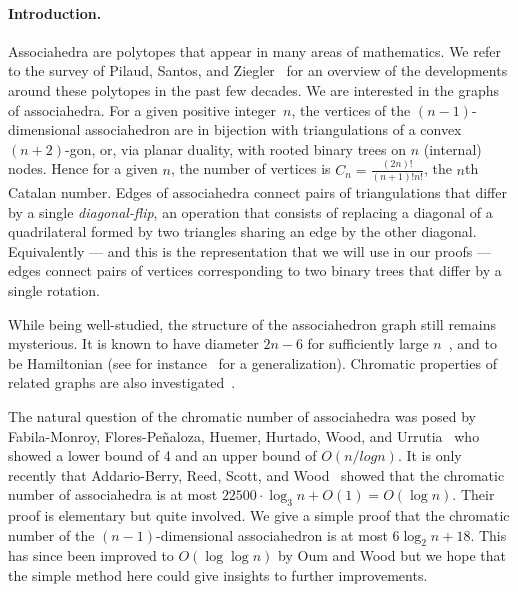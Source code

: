 \documentclass[10pt,a4paper]{article}
\begin{document}
\paragraph{Introduction.}
Associahedra are polytopes that appear in many areas of mathematics.
We refer to the survey of Pilaud, Santos, and Ziegler~\cite{MR4675114} for an overview of the developments around these polytopes in the past few decades.
We are interested in the graphs of associahedra.
For a given positive integer~$n$, the vertices of the $(n-1)$-dimensional associahedron are in bijection with triangulations of a convex $(n+2)$-gon, or, via planar duality, with rooted binary trees on $n$ (internal) nodes.
Hence for a given $n$, the number of vertices is $C_n = \frac{(2n)!}{(n+1)!n!}$, the $n$th Catalan number.
Edges of associahedra connect pairs of triangulations that differ by a single
\emph{diagonal-flip}, an operation that consists of 
replacing a diagonal of a quadrilateral
formed by two triangles sharing an edge by the other diagonal. Equivalently
--- and this is the representation that we will use in our proofs ---
edges connect pairs of vertices corresponding to two binary trees that differ by
a single rotation.%

While being well-studied, the structure of the associahedron graph still remains
mysterious. It is known to have diameter $2n-6$ for sufficiently large $n$~\cite{MR4556611,MR3197650}, and
to be Hamiltonian (see for instance~\cite{MR3383157} for a generalization).
Chromatic properties of related graphs are also investigated~\cite{MR4778792,GargantiniPastineEtAl2026,MPZZ25}.

The natural question of the chromatic number of associahedra was posed by Fabila-Monroy, Flores-Pe\~naloza, Huemer, Hurtado, Wood, and Urrutia~\cite{DBLP:journals/dmtcs/MonroyFHHWU09} who showed a lower bound of 4 and an upper bound of $O(n/log n)$.
It is only recently that Addario-Berry, Reed, Scott, and Wood~\cite{Addario-Berry_Reed_Scott_Wood_2026} showed that the chromatic number of associahedra is at most $22500 \cdot \log_3 n + O(1) = O(\log n)$.
Their proof is elementary but quite involved. We give a simple proof that the chromatic
number of the $(n-1)$-dimensional associahedron is at most $6\log_2 n + 18$. This has since been improved to $O(\log \log n)$ \cite{oum2026doublelogarithmicupperboundchromatic} by Oum and Wood but we hope that the simple method here could give insights to further improvements.
\end{document}
